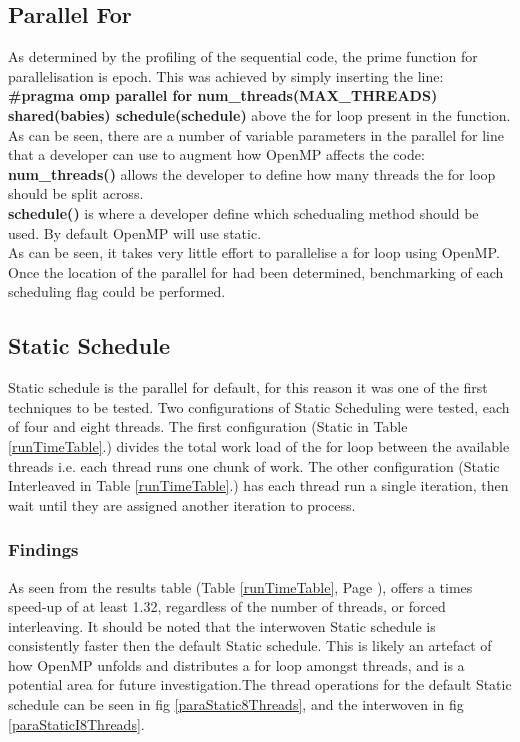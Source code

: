 \documentclass[journal,transmag]{IEEEtran}
\begin{document}
		\subsection{Parallel For}
			As determined by the profiling of the sequential code, the prime function for parallelisation is epoch. This was achieved by simply inserting the line: 
			\textbf{\#pragma omp parallel for num\_threads(MAX\_THREADS) shared(babies) schedule(schedule)}
			above the for loop present in the function. As can be seen, there are a number of variable parameters in the parallel for line that a developer can use to augment how OpenMP affects the code: \\
			\textbf{num\_threads()} allows the developer to define how many threads the for loop should be split across.\\
			\textbf{schedule()} is where a developer define which schedualing method should be used. By default OpenMP will use static.\\
			As can be seen, it takes very little effort to parallelise a for loop using OpenMP. Once the location of the parallel for had been determined, benchmarking of each scheduling flag could be performed. 
			
	\subsection{Static Schedule}
		Static schedule is the parallel for default, for this reason it was one of the first techniques to be tested. Two configurations of Static Scheduling were tested, each of four and eight threads. The first configuration (Static in Table \ref{runTimeTable}.) divides the total work load of the for loop between the available threads i.e. each thread runs one chunk of work. The other configuration (Static Interleaved in Table \ref{runTimeTable}.) has each thread run a single iteration, then wait until they are assigned another iteration to process.
		\subsubsection{Findings}
			As seen from the results table (Table \ref{runTimeTable}, Page \pageref{runTimeTable}), offers a times speed-up of at least 1.32, regardless of the number of threads, or forced interleaving.
			It should be noted that the interwoven Static schedule is consistently faster then the default Static schedule. This is likely an artefact of how OpenMP unfolds and distributes a for loop amongst threads, and is a potential area for future investigation.The thread operations for the default Static schedule can be seen in fig \ref{paraStatic8Threads}, and the interwoven in fig \ref{paraStaticI8Threads}.
\end{document}
